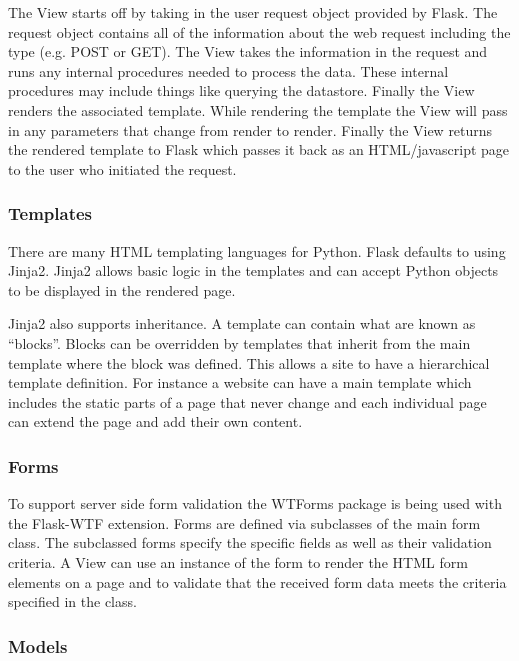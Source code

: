 \documentclass{article}
\begin{document}
The View starts off by taking in the user request object provided by Flask. The request object contains all of the information
about the web request including the type (e.g. POST or GET). The View takes the information in the request and runs 
any internal procedures needed to process the data. These internal procedures may include things like querying the datastore. Finally the View renders the associated template. While rendering the template the View will pass in any parameters that change from render to render. Finally the View returns the rendered template to Flask which passes it back
as an HTML/javascript page to the user who initiated the request.

\subsubsection{Templates}
\label{sec:Templates}

There are many HTML templating languages for Python. Flask defaults to using Jinja2. \cite{_jinja2_2008} Jinja2 allows basic logic
in the templates and can accept Python objects to be displayed in the rendered page.

Jinja2 also supports inheritance. \cite{ronacher_jinja2_2008} A template can contain what are known as ``blocks''. Blocks can be overridden by 
templates that inherit from the main template where the block was defined. This allows a site to have a hierarchical template
definition. For instance a website can have a main template which includes the static parts of a page that never change
and each individual page can extend the page and add their own content.

\subsubsection{Forms}
\label{sec:Forms}

To support server side form validation the WTForms package is being used with the Flask-WTF extension. \cite{wtforms_team_wtforms_2010} \cite{_flaskWTF} Forms are defined via subclasses of the main form class. The subclassed forms specify the specific fields
as well as their validation criteria. A View can use an instance of the form to render the HTML form elements on a page
and to validate that the received form data meets the criteria specified in the class.

\subsubsection{Models}
\label{sec:Models}
\end{document}
